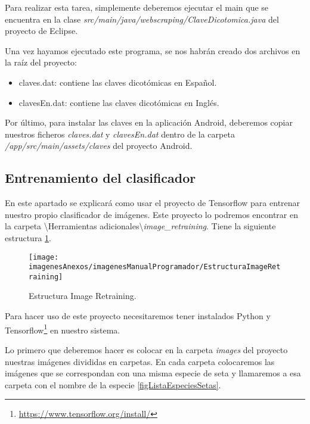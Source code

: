 Para realizar esta tarea, simplemente deberemos ejecutar el main que se encuentra en la clase \textit{src/main/java/webscraping/ClaveDicotomica.java} del proyecto de Eclipse.

Una vez hayamos ejecutado este programa, se nos habrán creado dos archivos en la raíz del proyecto:
\begin{itemize}
	\item claves.dat: contiene las claves dicotómicas en Español.
	\item clavesEn.dat: contiene las claves dicotómicas en Inglés.
\end{itemize}

Por último, para instalar las claves en la aplicación Android, deberemos copiar nuestros ficheros \textit{claves.dat} y \textit{clavesEn.dat} dentro de la carpeta \textit{/app/src/main/assets/claves} del proyecto Android.

\subsection{Entrenamiento del clasificador}

En este apartado se explicará como usar el proyecto de Tensorflow para entrenar nuestro propio clasificador de imágenes. Este proyecto lo podremos encontrar en la carpeta \textbackslash Herramientas adicionales\textbackslash \textit{image\_retraining}. Tiene la siguiente estructura \ref{figEstructuraImageRetraining}.

\begin{figure}[h]
    \begin{center}%
        \begin{center}%
          \texttt{[image: imagenesAnexos/imagenesManualProgramador/EstructuraImageRetraining]}%
          \caption{Estructura Image Retraining.}%
          \label{figEstructuraImageRetraining}%
        \end{center}%
  	\end{center}%
\end{figure}%

Para hacer uso de este proyecto necesitaremos tener instalados Python y Tensorflow\footnote{\url{https://www.tensorflow.org/install/}} en nuestro sistema.

Lo primero que deberemos hacer es colocar en la carpeta \textit{images} del proyecto nuestras imágenes divididas en carpetas. En cada carpeta colocaremos las imágenes que se correspondan con una misma especie de seta y 
llamaremos a esa carpeta con el nombre de la especie \ref{figListaEspeciesSetas}.

